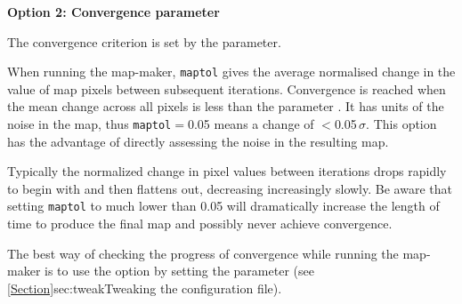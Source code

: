 \textbf{Option 2: Convergence parameter}

The convergence criterion is set by the  parameter.

When running the map-maker, \texttt{maptol} gives the average
normalised change in the value of map pixels
between subsequent iterations. Convergence is reached when the  mean
change across all pixels is less than the parameter .
It has units of the noise
in the map, thus \texttt{maptol}$=$0.05 means a change of
$<$0.05\,$\sigma$. This option has the advantage of directly assessing
the noise in the resulting map.

Typically the normalized change in pixel values between iterations
drops rapidly to begin with and then flattens out, decreasing
increasingly slowly.  Be aware that setting \texttt{maptol} to much
lower than 0.05 will dramatically increase the length of time to
produce the final map and possibly never achieve convergence.

The best way of checking the progress of convergence while running the
map-maker is to use the  option by setting the parameter
 (see \cref{Section}{sec:tweak}{Tweaking the
configuration file}).

